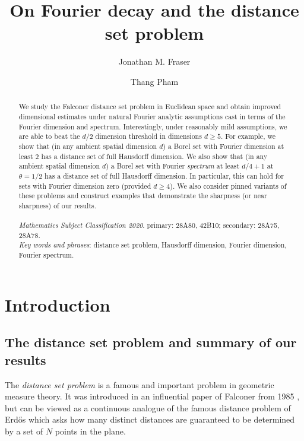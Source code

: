 \documentclass[11pt]{amsart}
\author@andify\authors
\title{On Fourier decay and the distance set problem}
\author{\large{Jonathan M. Fraser}}
\author{\large{Thang Pham}}
\numberwithin{equation}{section}
\renewcommand{\geq}{\geqslant}
\theoremstyle{plain}
\theoremstyle{remark}
\begin{document}

\maketitle
\thispagestyle{empty}

\begin{abstract}
We study the Falconer distance set problem in Euclidean space and obtain  improved dimensional estimates under natural  Fourier analytic assumptions cast in terms of the  Fourier dimension and spectrum.  Interestingly, under  reasonably mild  assumptions, we are able to beat the $d/2$ dimension threshold in dimensions $d \geq 5$. For example, we show that (in any ambient spatial dimension $d$) a Borel set with Fourier  dimension at least $2$ has a distance set of full Hausdorff dimension.  We also show that (in any ambient spatial dimension $d$) a Borel set with Fourier  \emph{spectrum} at least $d/4+1$ at $\theta=1/2$ has a distance set of full Hausdorff dimension.  In particular, this can hold for sets with Fourier dimension zero (provided $d \geq 4$). We also consider pinned variants of these problems and construct examples that demonstrate the sharpness (or near sharpness) of our results. 
\\ \\ 
\emph{Mathematics Subject Classification 2020}. primary: 28A80, 42B10; secondary: 28A75, 28A78.
\\
\emph{Key words and phrases}:  distance set problem, Hausdorff dimension, Fourier dimension, Fourier spectrum.
\end{abstract}

\tableofcontents

\section{Introduction}

\subsection{The distance set problem and summary of our results}

The \emph{distance set problem} is a famous and important problem in geometric measure theory.  It was introduced in an influential paper of Falconer from 1985 \cite{distance}, but can be viewed as a continuous analogue of the famous distance problem of Erd\H{o}s which asks how many distinct distances are guaranteed to  be determined by a set of $N$ points in the plane.  
\end{document}
